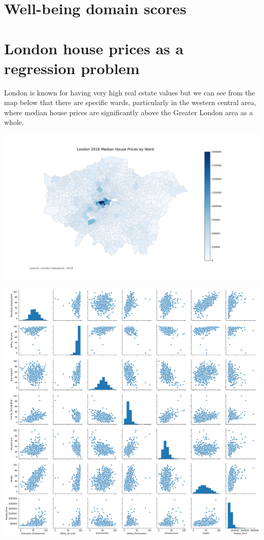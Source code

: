\section{Well-being domain scores}




\section{London house prices as a regression problem}

London is known for having very high real estate values but we can see from the map below that there are specific wards, particularly in the western central area, where median house prices are significantly above the Greater London area as a whole.

\includegraphics[scale=0.4]{figures/HPMedian} %


\includegraphics[scale=0.3]{figures/pairplot} %

